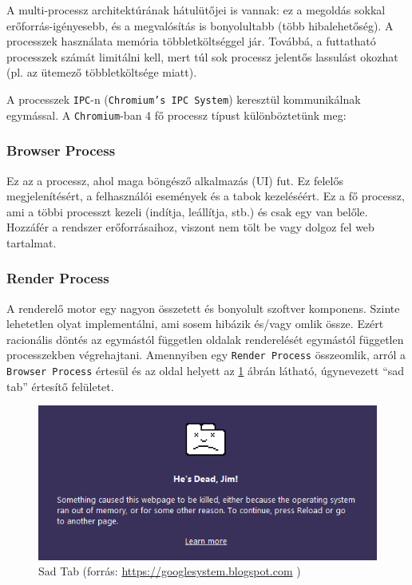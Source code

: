 \documentclass[12pt]{report}
\let\origurl\url
\renewcommand{\url}[1]{%
    \textcolor{blue}{\origurl{#1}}
}
\begin{document}
A multi-processz architektúrának hátulütőjei is vannak: ez a megoldás sokkal \\
erőforrás-igényesebb, és a megvalósítás is bonyolultabb (több hibalehetőség).
A processzek használata memória többletköltséggel jár. Továbbá, a futtatható processzek
számát limitálni kell, mert túl sok processz jelentős lassulást okozhat (pl. az ütemező
többletköltsége miatt).

A processzek \texttt{IPC}-n (\texttt{Chromium's IPC System}) keresztül kommunikálnak
egymással. A \texttt{Chromium}-ban 4 fő processz típust különböztetünk meg:

\subsubsection{Browser Process}
Ez az a processz, ahol maga böngésző alkalmazás (UI) fut. Ez felelős megjelenítésért,
a felhasználói események és a tabok kezeléséért. Ez a fő processz, ami a többi processzt
kezeli (indítja, leállítja, stb.) és csak egy van belőle. Hozzáfér a rendszer erőforrásaihoz,
viszont nem tölt be vagy dolgoz fel web tartalmat.

\subsubsection{Render Process}
A renderelő motor egy nagyon összetett és bonyolult szoftver komponens. Szinte lehetetlen
olyat implementálni, ami sosem hibázik és/vagy omlik össze. \cite{bib-chromium-multi-process}
Ezért racionális döntés az egymástól független oldalak renderelését egymástól független
processzekben végrehajtani. Amennyiben egy \texttt{Render Process} összeomlik, arról a
\texttt{Browser Process} értesül és az oldal helyett az \ref{fig-sad-tab} ábrán látható,
úgynevezett ``sad tab'' értesítő felületet.

\begin{figure}[h]
    \centering
    \includegraphics[scale=0.5]{sad_tab}
    \caption{
        \label{fig-sad-tab}
        Sad Tab (forrás: \url{https://googlesystem.blogspot.com} \cite{bib-sad-tab})
    }
\end{figure}
\end{document}
